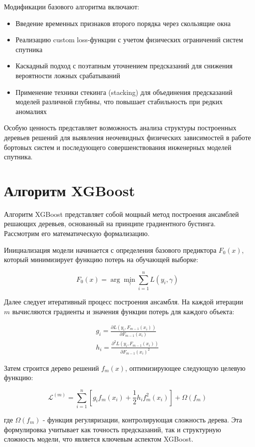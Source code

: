 Модификации базового алгоритма включают:
\begin{itemize}
    \item Введение временных признаков второго порядка через скользящие окна
    \item Реализацию custom loss-функции с учетом физических ограничений систем спутника
    \item Каскадный подход с поэтапным уточнением предсказаний для снижения вероятности ложных срабатываний
    \item Применение техники стекинга (stacking) для объединения предсказаний моделей различной глубины, что повышает стабильность при редких аномалиях
\end{itemize}

Особую ценность представляет возможность анализа структуры построенных деревьев решений для выявления неочевидных физических зависимостей в работе бортовых систем и последующего совершенствования инженерных моделей спутника.


\section{Алгоритм XGBoost}

Алгоритм XGBoost представляет собой мощный метод построения ансамблей решающих
деревьев, основанный на принципе градиентного бустинга. Рассмотрим его
математическую формализацию.

Инициализация модели начинается с определения базового предиктора $F_0(x)$,
который минимизирует функцию потерь на обучающей выборке:

\[F_0(x) = \arg \min_{\gamma} \sum_{i=1}^n L(y_i, \gamma)\]

Далее следует итеративный процесс построения ансамбля. На каждой итерации $m$
вычисляются градиенты и значения функции потерь для каждого объекта:

\begin{gather*}
	g_i = \frac{\partial L(y_i, F_{m-1}(x_i))}{\partial F_{m-1}(x_i)}\\
	h_i = \frac{\partial^2 L(y_i, F_{m-1}(x_i))}{\partial F_{m-1}(x_i)^2}
\end{gather*}

Затем строится дерево решений $f_m(x)$, оптимизирующее следующую целевую функцию:

\[\mathcal{L}^{(m)} = \sum_{i=1}^n \left[ g_i f_m(x_i) + \frac{1}{2} h_i f_m^2(x_i) \right] + \Omega(f_m)\]

где $\Omega(f_m)$ - функция регуляризации, контролирующая сложность дерева. Эта
формулировка учитывает как точность предсказаний, так и структурную сложность
модели, что является ключевым аспектом XGBoost.

